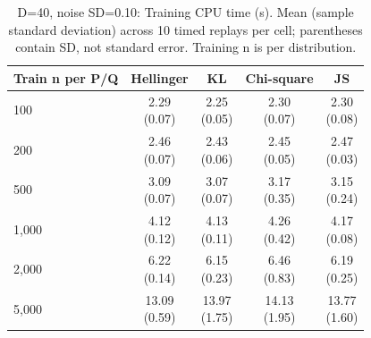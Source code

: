 \begin{table}[t]
\centering
\small
\setlength{\tabcolsep}{4pt}
\caption{D=40, noise SD=0.10: Training CPU time (s). Mean (sample standard deviation) across 10 timed replays per cell; parentheses contain SD, not standard error. Training n is per distribution.}
\label{tab:sim-d-40-noise-sd-0-10-training-cpu-time-s}
\begin{tabular}{lcccc}
\toprule
Train n per P/Q & Hellinger & KL & Chi-square & JS \\
\midrule
100 & \shortstack{2.29\\(0.07)} & \shortstack{2.25\\(0.05)} & \shortstack{2.30\\(0.07)} & \shortstack{2.30\\(0.08)} \\
200 & \shortstack{2.46\\(0.07)} & \shortstack{2.43\\(0.06)} & \shortstack{2.45\\(0.05)} & \shortstack{2.47\\(0.03)} \\
500 & \shortstack{3.09\\(0.07)} & \shortstack{3.07\\(0.07)} & \shortstack{3.17\\(0.35)} & \shortstack{3.15\\(0.24)} \\
1,000 & \shortstack{4.12\\(0.12)} & \shortstack{4.13\\(0.11)} & \shortstack{4.26\\(0.42)} & \shortstack{4.17\\(0.08)} \\
2,000 & \shortstack{6.22\\(0.14)} & \shortstack{6.15\\(0.23)} & \shortstack{6.46\\(0.83)} & \shortstack{6.19\\(0.25)} \\
5,000 & \shortstack{13.09\\(0.59)} & \shortstack{13.97\\(1.75)} & \shortstack{14.13\\(1.95)} & \shortstack{13.77\\(1.60)} \\
\bottomrule
\end{tabular}
\end{table}


